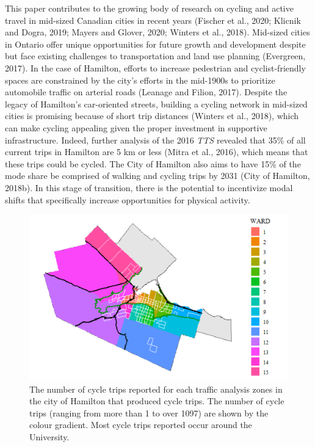 \documentclass[]{elsarticle} %
\begin{document}
This paper contributes to the growing body of research on cycling and
active travel in mid-sized Canadian cities in recent years (Fischer et
al., 2020; Klicnik and Dogra, 2019; Mayers and Glover, 2020; Winters et
al., 2018). Mid-sized cities in Ontario offer unique opportunities for
future growth and development despite but face existing challenges to
transportation and land use planning (Evergreen, 2017). In the case of
Hamilton, efforts to increase pedestrian and cyclist-friendly spaces are
constrained by the city's efforts in the mid-1900s to prioritize
automobile traffic on arterial roads (Leanage and Filion, 2017). Despite
the legacy of Hamilton's car-oriented streets, building a cycling
network in mid-sized cities is promising because of short trip distances
(Winters et al., 2018), which can make cycling appealing given the
proper investment in supportive infrastructure. Indeed, further analysis
of the 2016 \emph{TTS} revealed that 35\% of all current trips in
Hamilton are 5 km or less (Mitra et al., 2016), which means that these
trips could be cycled. The City of Hamilton also aims to have 15\% of
the mode share be comprised of walking and cycling trips by 2031 (City
of Hamilton, 2018b). In this stage of transition, there is the potential
to incentivize modal shifts that specifically increase opportunities for
physical activity.

\begin{figure}

{\centering \includegraphics[width=0.65\linewidth]{Cycling-Hamilton} 

}

\caption{The number of cycle trips reported for each traffic analysis zones in the city of Hamilton that produced cycle trips. The number of cycle trips (ranging from more than 1 to over 1097) are shown by the colour gradient. Most cycle trips reported occur around the University.}\label{fig:figure-1}
\end{figure}
\end{document}
